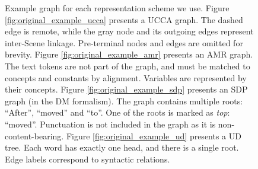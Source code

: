 \documentclass[11pt,a4paper]{article}
\begin{document}
\begin{figure}



\caption{\label{fig:original_examples}
 Example graph for each representation scheme we use.
 Figure \ref{fig:original_example_ucca} presents a UCCA graph. The dashed edge is remote,
  while the gray node and its outgoing edges represent inter-Scene linkage.
  Pre-terminal nodes and edges are omitted for brevity. 
 Figure \ref{fig:original_example_amr} presents an AMR graph.
  The text tokens are not part of the graph, and must be matched to
  concepts and constants by alignment. Variables are represented by their concepts.
 Figure \ref{fig:original_example_sdp} presents an SDP graph (in the DM formalism).
  The graph contains multiple roots: ``After'', ``moved'' and ``to''.
  One of the roots is marked as \textit{top}: ``moved''.
  Punctuation is not included in the graph as it is non-content-bearing.
 Figure \ref{fig:original_example_ud} presents a UD tree.
  Each word has exactly one head, and there is a single root.
  Edge labels correspond to syntactic relations.
}

\end{figure}
\end{document}
